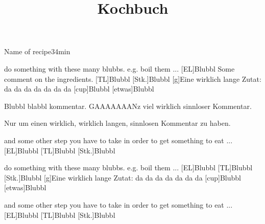 \documentclass[ngerman,parskip=full]{article}
\title{Kochbuch}
\begin{document}
\maketitle

\begin{recipe}{Name of recipe}{3}{4min}
  \begin{step}{do something with these many blubbs. e.g. boil them ...}
    [EL]{Blubbl}
    Some comment on the ingredients.
    [TL]{Blubbl}
    [Stk.]{Blubbl}
    [g]{Eine wirklich lange Zutat: da da da da da da da}
    [cup]{Blubbl}
    [etwas]{Blubbl}
  \end{step}
  Blubbl blabbl kommentar. GAAAAAAANz viel wirklich sinnloser Kommentar.\par
  Nur um einen wirklich, wirklich langen, sinnlosen Kommentar zu haben.
  \begin{step}{and some other step you have to take in order to get
      something to eat ...}
    [EL]{Blubbl}
    [TL]{Blubbl}
    [Stk.]{Blubbl}
  \end{step}
  \begin{step}{do something with these many blubbs. e.g. boil them ...}
    [EL]{Blubbl}
    [TL]{Blubbl}
    [Stk.]{Blubbl}
    [g]{Eine wirklich lange Zutat: da da da da da da da}
    [cup]{Blubbl}
    [etwas]{Blubbl}
  \end{step}
  \begin{step}{and some other step you have to take in order to get
      something to eat ...}
    [EL]{Blubbl}
    [TL]{Blubbl}
    [Stk.]{Blubbl}
  \end{step}
\end{recipe}
\end{document}
